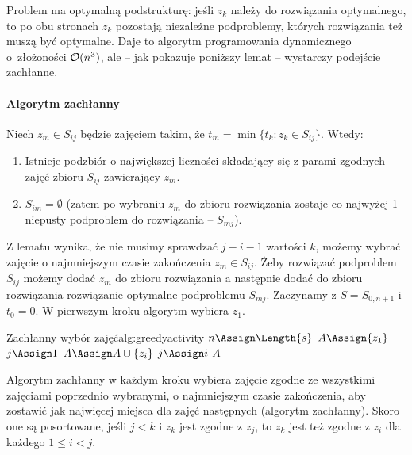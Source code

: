 Problem ma optymalną podstrukturę: jeśli $z_k$ należy do rozwiązania optymalnego, to po obu stronach
$z_k$ pozostają niezależne podproblemy, których rozwiązania też muszą być optymalne. Daje to algorytm
programowania dynamicznego o~złożoności $\mathcal{O}(n^3)$, ale -- jak pokazuje poniższy lemat -- wystarczy podejście
zachłanne.

\paragraph{Algorytm zachłanny}
\begin{lemma}
	Niech $z_m \in S_{ij}$ będzie zajęciem takim, że $t_m = \min \{t_k : z_k \in S_{ij}\}$. Wtedy:
	\begin{enumerate}
		\item\label{lem:greedy-exists} Istnieje podzbiór o największej liczności składający się z parami zgodnych zajęć zbioru $S_{ij}$ zawierający $z_m$.
		\item\label{lem:greedy-empty} $S_{im} = \emptyset$ (zatem po wybraniu $z_m$ do zbioru rozwiązania zostaje co najwyżej 1 niepusty podproblem do rozwiązania -- $S_{mj}$).
	\end{enumerate}
\end{lemma}

Z lematu wynika, że nie musimy sprawdzać $j - i - 1$ wartości $k$, możemy wybrać zajęcie o najmniejszym czasie zakończenia $z_m \in S_{ij}$.
Żeby rozwiązać podproblem $S_{ij}$ możemy dodać $z_m$ do zbioru rozwiązania a następnie dodać do zbioru rozwiązania rozwiązanie optymalne podproblemu $S_{mj}$. Zaczynamy z $S = S_{0, n+1}$ i $t_0 = 0$. W pierwszym kroku algorytm wybiera $z_1$.

\begin{alg}{Zachłanny wybór zajęć}{alg:greedyactivity}
	 
	\State $n \Assign \Length{s}$
	\State $A \Assign \{z_1\}$ 
	\State $j \Assign 1$
	\State $A \Assign A \cup \{z_i\}$
	\State $j \Assign i$
	\EndIf
	\EndFor
	\State \Return $A$
	\EndFunction
\end{alg}

Algorytm zachłanny w każdym kroku wybiera zajęcie zgodne ze wszystkimi zajęciami poprzednio wybranymi, o najmniejszym czasie zakończenia, aby zostawić jak najwięcej miejsca dla zajęć następnych (algorytm zachłanny). Skoro one są posortowane, jeśli $j < k$ i $z_k$ jest zgodne z $z_j$, to $z_k$ jest też zgodne z $z_i$ dla każdego $1 \leq i < j$.


